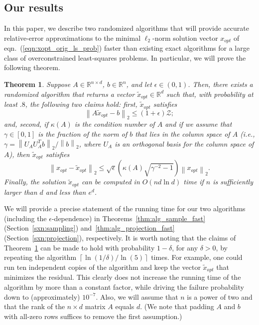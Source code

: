 \documentclass[11pt]{article}
\newcommand{\VTTNorm }[1]{\mbox{}\left\|#1\right\|_2  }
\newtheorem{theorem}{Theorem}
\begin{document}
\subsection{Our results}\label{sxn:intro:ourresults}

In this paper, we describe two randomized algorithms that will provide accurate relative-error approximations to the minimal $\ell_2$-norm solution vector $x_{opt}$ of eqn.~(\ref{eqn:xopt_orig_ls_prob}) faster than existing exact algorithms for a large class of overconstrained least-squares problems. In particular, we will prove the following theorem.

\begin{theorem}
\label{thm:main_result}
Suppose $A \in \mathbb{R}^{n \times d}$, $b \in \mathbb{R}^{n}$, and let $\epsilon \in (0,1)$. Then, there exists a randomized algorithm that returns a vector $\tilde{x}_{opt} \in \mathbb{R}^d$ such that, with probability at least $.8$, the following two claims hold: first, $\tilde{x}_{opt}$ satisfies
\begin{equation}
\label{eqn:result1_intro}
\VTTNorm{A\tilde{x}_{opt}-b} \le (1+\epsilon) \mathcal{Z}  ;
\end{equation}
and, second, if $\kappa(A)$ is the condition number of $A$ and if we assume that $\gamma \in [0,1]$ is the fraction of the norm of $b$ that lies in the column space of $A$ (i.e., $\gamma = \VTTNorm{U_A U_A^T b}/\VTTNorm{b}$, where $U_A$ is an orthogonal basis for the column space of $A$), then $\tilde{x}_{opt}$ satisfies
\begin{equation}
\label{eqn:result2_intro}
\VTTNorm{x_{opt}-\tilde{x}_{opt}}
  \leq \sqrt{\epsilon}
       \left(\kappa(A)
       \sqrt{\gamma^{-2}-1}\right)
       \VTTNorm{x_{opt}}.
\end{equation}
Finally, the solution $\tilde{x}_{opt}$ can be computed in $O(nd \ln d)$ time if $n$ is sufficiently larger than $d$ and less than $e^d$.
\end{theorem}
We will provide a precise statement of the running time for our two algorithms (including the $\epsilon$-dependence) in Theorems~\ref{thm:alg_sample_fast} (Section~\ref{sxn:sampling})
and~\ref{thm:alg_projection_fast} (Section~\ref{sxn:projection}), respectively. It is worth noting that the claims of Theorem~\ref{thm:main_result} can be made to hold with probability $1-\delta$, for any $\delta>0$, by repeating the algorithm $\left\lceil \ln(1/\delta)/\ln(5)\right\rceil$ times. For example, one could run ten independent copies of the algorithm and keep the vector $\tilde{x}_{opt}$ that minimizes the residual. This clearly does not increase the running time of the algorithm by more than a constant factor, while driving the failure probability down to (approximately) $10^{-7}$. Also, we will assume that $n$ is a power of two and that the rank of the $n \times d$ matrix $A$ equals $d$. (We note that padding $A$ and $b$ with all-zero rows suffices to remove the first assumption.)
\end{document}
